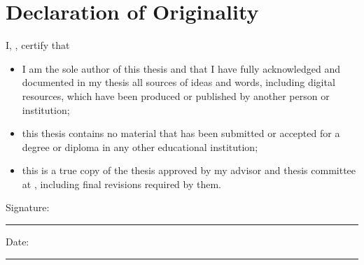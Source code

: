 \chapter*{Declaration of Originality}

\vspace{20pt}

\noindent I, \authname, certify that 
\begin{itemize} 
	\item I am the sole author of this thesis and that I have fully acknowledged and documented in my thesis all sources of ideas and words, including digital resources, which have been produced or published by another person or institution;
	\item this thesis contains no material that has been submitted or accepted for a degree or diploma in any other educational institution;
	\item this is a true copy of the thesis approved by my advisor and thesis committee at \univname, including final revisions required by them.
\end{itemize}
 
\vspace{40pt}

\noindent Signature:\\
\rule[0.5em]{25em}{0.5pt} %
 
\noindent Date:\\
\rule[0.5em]{25em}{0.5pt} %

